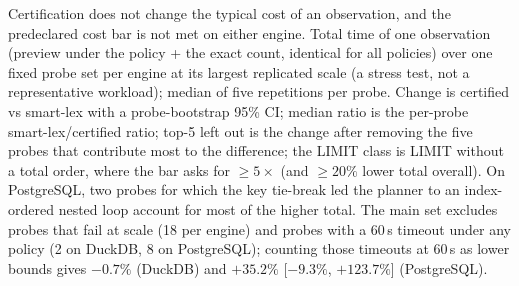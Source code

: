 \begin{table}[t]
  \caption{Certification does not change the typical cost of an observation, and the predeclared cost bar is not met
  on either engine. Total time of one observation (preview under the policy + the exact count, identical for all
  policies) over one fixed probe set per engine at its largest replicated scale (a stress test, not a representative
  workload); median of five repetitions per probe. Change is certified vs smart-lex with a probe-bootstrap 95\% CI;
  median ratio is the per-probe smart-lex/certified ratio; top-5 left out is the change after removing the five probes
  that contribute most to the difference; the LIMIT class is LIMIT without a total order, where the bar asks for
  $\geq 5\times$ (and $\geq 20\%$ lower total overall). On PostgreSQL, two probes for which the key tie-break led the
  planner to an index-ordered nested loop account for most of the higher total. The main set excludes probes that fail
  at scale (18 per engine) and probes with a 60\,s timeout under any policy (2 on DuckDB, 8 on PostgreSQL); counting
  those timeouts at 60\,s as lower bounds gives $-0.7\%$ (DuckDB) and $+35.2\%$ [$-9.3\%$, $+123.7\%$] (PostgreSQL).}
  \label{tab:cost}
  \centering\small
  
\end{table}
